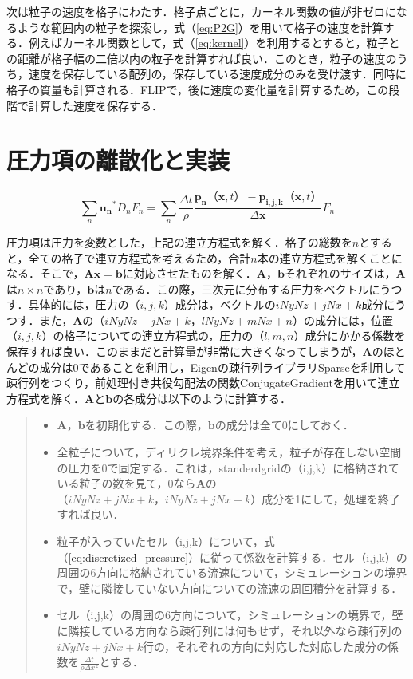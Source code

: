 \documentclass[a4j,12pt]{jreport}
\begin{document}
次は粒子の速度を格子にわたす．格子点ごとに，カーネル関数の値が非ゼロになるような範囲内の粒子を探索し，式（\ref{eq:P2G}）を用いて格子の速度を計算する．例えばカーネル関数として，式（\ref{eq:kernel}）を利用するとすると，粒子との距離が格子幅の二倍以内の粒子を計算すれば良い．このとき，粒子の速度のうち，速度を保存している配列の，保存している速度成分のみを受け渡す．同時に格子の質量も計算される．FLIPで，後に速度の変化量を計算するため，この段階で計算した速度を保存する．

\section{圧力項の離散化と実装} \label{sec:Imppressure}
\begin{equation}
\sum_{n}\bm{u_n}^*D_nF_n= \sum_{n}\frac{\varDelta t}{\rho}\frac{\bm{p_n}（\bm{x},t） - \bm{p_{i,j,k}}（\bm{x},t）}{\varDelta \bm{x}}F_n
\end{equation}

圧力項は圧力を変数とした，上記の連立方程式を解く．格子の総数を$n$とすると，全ての格子で連立方程式を考えるため，合計$n$本の連立方程式を解くことになる．そこで，$\bm{Ax=b}$に対応させたものを解く．$\bm{A}$，$\bm{b}$それぞれのサイズは，$\bm{A}$は$n \times n$であり，$\bm{b}$は$n$である．この際，三次元に分布する圧力をベクトルにうつす．具体的には，圧力の$（i,j,k）$成分は，ベクトルの$iNyNz+jNx+k$成分にうつす．また，$\bm{A}$の$（iNyNz+jNx+k，lNyNz+mNx+n）$の成分には，位置$（i,j,k）$の格子についての連立方程式の，圧力の$（l,m,n）$成分にかかる係数を保存すれば良い．このままだと計算量が非常に大きくなってしまうが，$\bm{A}$のほとんどの成分は$0$であることを利用し，Eigenの疎行列ライブラリSparseを利用して疎行列をつくり，前処理付き共役勾配法の関数ConjugateGradientを用いて連立方程式を解く．$\bm{A}$と$\bm{b}$の各成分は以下のように計算する．
\begin{quote}
	\begin{itemize}
		\item $\bm{A}$，$\bm{b}$を初期化する．この際，$\bm{b}$の成分は全て0にしておく．
		\item 全粒子について，ディリクレ境界条件を考え，粒子が存在しない空間の圧力を$0$で固定する．これは，standerdgridの（i,j,k）に格納されている粒子の数を見て，0なら$\bm{A}$の$（iNyNz+jNx+k，iNyNz+jNx+k）$成分を1にして，処理を終了すれば良い．
		\item 粒子が入っていたセル（i,j,k）について，式（\ref{eq:discretized_pressure}）に従って係数を計算する．セル（i,j,k）の周囲の6方向に格納されている流速について，シミュレーションの境界で，壁に隣接していない方向についての流速の周回積分を計算する．
		\item セル（i,j,k）の周囲の6方向について，シミュレーションの境界で，壁に隣接している方向なら疎行列には何もせず，それ以外なら疎行列の$iNyNz+jNx+k$行の，それぞれの方向に対応した対応した成分の係数を$\frac{\varDelta t}{\rho\varDelta x^2}$とする．
	\end{itemize}
\end{quote}
\end{document}
